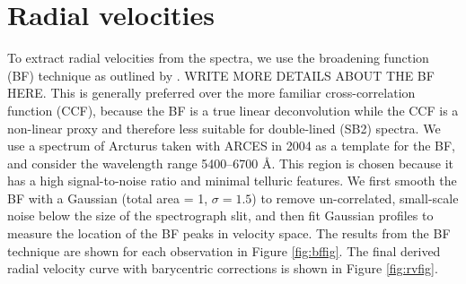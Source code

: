 \section{Radial velocities}\label{rvs}
To extract radial velocities from the spectra, we use the broadening function (BF) technique as outlined by \citet{ruc02}.
WRITE MORE DETAILS ABOUT THE BF HERE.
This is generally preferred over the more familiar cross-correlation function (CCF), because the BF is a true linear deconvolution while the CCF is a non-linear proxy and therefore less suitable for double-lined (SB2) spectra. We use a spectrum of Arcturus taken with ARCES in 2004 as a template for the BF, and consider the wavelength range 5400--6700 \AA. This region is chosen because it has a high signal-to-noise ratio and minimal telluric features. We first smooth the BF with a Gaussian (total area = 1, $\sigma=1.5$) to remove un-correlated, small-scale noise below the size of the spectrograph slit, and then fit Gaussian profiles to measure the location of the BF peaks in velocity space. The results from the BF technique are shown for each observation in Figure \ref{fig:bffig}. The final derived radial velocity curve with barycentric corrections is shown in Figure \ref{fig:rvfig}.
